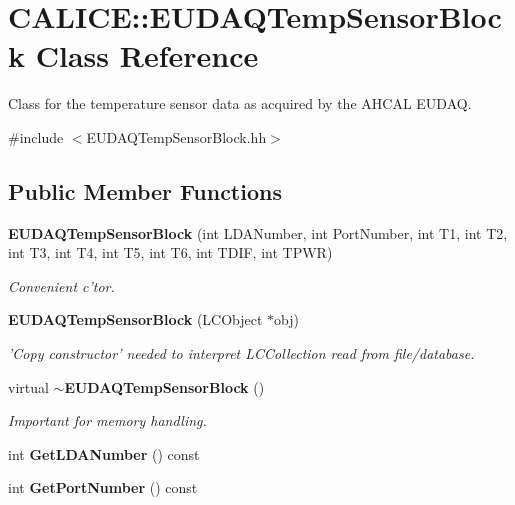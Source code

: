 \section{CALICE::EUDAQTempSensorBlock Class Reference}
\label{classCALICE_1_1EUDAQTempSensorBlock}


Class for the temperature sensor data as acquired by the AHCAL EUDAQ.  


{\ttfamily \#include $<$EUDAQTempSensorBlock.hh$>$}\subsection*{Public Member Functions}
\begin{DoxyCompactItemize}
\item 
{\bf EUDAQTempSensorBlock} (int LDANumber, int PortNumber, int T1, int T2, int T3, int T4, int T5, int T6, int TDIF, int TPWR)\label{classCALICE_1_1EUDAQTempSensorBlock_ae02d2597a925e3e7fd290a0b31d685c3}

\begin{DoxyCompactList}\small\item\em Convenient c'tor. \item\end{DoxyCompactList}\item 
{\bf EUDAQTempSensorBlock} (LCObject $\ast$obj)\label{classCALICE_1_1EUDAQTempSensorBlock_ac20c9533a2640ee57f741cfca85937eb}

\begin{DoxyCompactList}\small\item\em 'Copy constructor' needed to interpret LCCollection read from file/database. \item\end{DoxyCompactList}\item 
virtual {\bf $\sim$EUDAQTempSensorBlock} ()\label{classCALICE_1_1EUDAQTempSensorBlock_a482b674c4674680f57ad441d32d3e7f6}

\begin{DoxyCompactList}\small\item\em Important for memory handling. \item\end{DoxyCompactList}\item 
int {\bfseries GetLDANumber} () const \label{classCALICE_1_1EUDAQTempSensorBlock_ae2f5861ac123e152117d8086d260ed28}

\item 
int {\bfseries GetPortNumber} () const \label{classCALICE_1_1EUDAQTempSensorBlock_aa85c8473e68609696ef73732ce2e1c73}


\end{DoxyCompactItemize}
